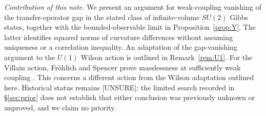 \documentclass[11pt,a4paper]{article}
\theoremstyle{plain}
\theoremstyle{definition}
\theoremstyle{remark}
\numberwithin{equation}{section}
\newcommand{\st}[1]{\textsf{[#1]}}
\begin{document}
\emph{Contribution of this note.} We present an argument for weak-coupling vanishing of the transfer-operator gap in the stated class of
infinite-volume $SU(2)$ Gibbs states, together with the bounded-observable limit in Proposition~\ref{prop:Y}. The latter identifies squared norms of
curvature differences without assuming uniqueness or a correlation inequality. An adaptation of the gap-vanishing argument to the
$U(1)$ Wilson action is outlined in Remark~\ref{rem:U1}. For the Villain action, Fr\"ohlich and Spencer prove masslessness at sufficiently
weak coupling \cite[\S2.11]{FS82}. This concerns a different action from the Wilson adaptation outlined here.
Historical status remains \st{UNSURE}: the limited search
recorded in \S\ref{sec:prior} does not establish that either conclusion was previously unknown or unproved, and we claim no priority.
\end{document}

